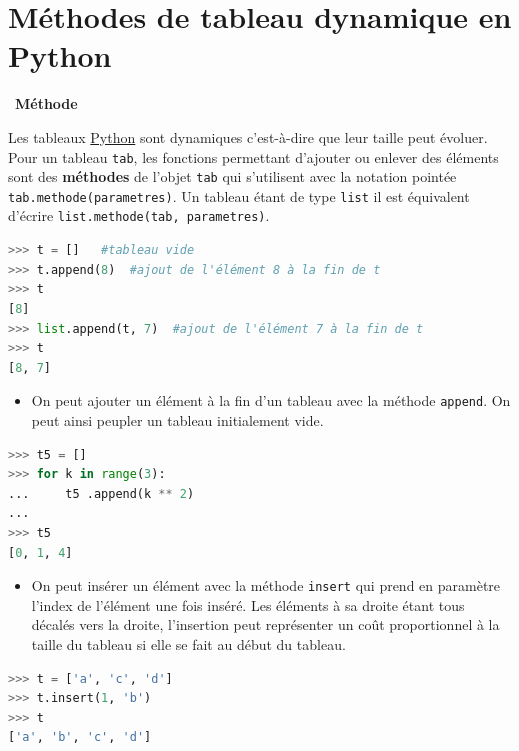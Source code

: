 \documentclass[
  11pt,
]{article}
\newcommand{\passthrough}[1]{#1}
\providecommand{\tightlist}{%
  \setlength{\itemsep}{0pt}\setlength{\parskip}{0pt}}
\newcounter{prop}
\newenvironment{methode}[1]
{\par \medskip    \noindent  
 \begin {bclogo}[arrondi =0.1,logo=\bcoutil, marge=4,noborder = true] {~\textbf{Méthode}   {\itshape #1} }  \par}
{
\end{bclogo}
 \par \bigskip }
\begin{document}
\hypertarget{muxe9thodes-de-tableau-dynamique-en-python}{%
\section{Méthodes de tableau dynamique en
Python}\label{muxe9thodes-de-tableau-dynamique-en-python}}

\begin{methode}{}

Les tableaux
\href{https://docs.python.org/3/tutorial/datastructures.html}{Python}
sont dynamiques c'est-à-dire que leur taille peut évoluer. Pour un
tableau \passthrough{\lstinline!tab!}, les fonctions permettant
d'ajouter ou enlever des éléments sont des \textbf{méthodes} de l'objet
\passthrough{\lstinline!tab!} qui s'utilisent avec la notation pointée
\passthrough{\lstinline!tab.methode(parametres)!}. Un tableau étant de
type \passthrough{\lstinline!list!} il est équivalent d'écrire
\passthrough{\lstinline!list.methode(tab, parametres)!}.

\begin{lstlisting}[language=Python]
>>> t = []   #tableau vide
>>> t.append(8)  #ajout de l'élément 8 à la fin de t
>>> t
[8]
>>> list.append(t, 7)  #ajout de l'élément 7 à la fin de t
>>> t
[8, 7]
\end{lstlisting}

\begin{itemize}
\tightlist
\item
  On peut ajouter un élément à la fin d'un tableau avec la méthode
  \passthrough{\lstinline!append!}. On peut ainsi peupler un tableau
  initialement vide.
\end{itemize}

\begin{lstlisting}[language=Python]
>>> t5 = []
>>> for k in range(3):
...     t5 .append(k ** 2)
... 
>>> t5
[0, 1, 4]
\end{lstlisting}

\begin{itemize}
\tightlist
\item
  On peut insérer un élément avec la méthode
  \passthrough{\lstinline!insert!} qui prend en paramètre l'index de
  l'élément une fois inséré. Les éléments à sa droite étant tous décalés
  vers la droite, l'insertion peut représenter un coût proportionnel à
  la taille du tableau si elle se fait au début du tableau.
\end{itemize}

\begin{lstlisting}[language=Python]
>>> t = ['a', 'c', 'd']
>>> t.insert(1, 'b')
>>> t
['a', 'b', 'c', 'd']
\end{lstlisting}


\end{methode}
\end{document}
